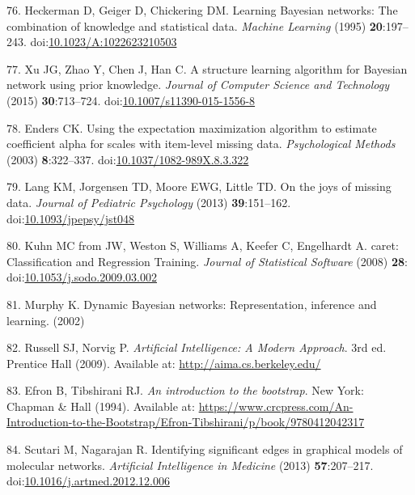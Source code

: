 \documentclass[
  english,
  man]{apa6}
\newenvironment{cslreferences}%
  {}%
  {\par}
\begin{document}
\begin{cslreferences}
\leavevmode\hypertarget{ref-Heckerman1995}{}%
76. Heckerman D, Geiger D, Chickering DM. Learning Bayesian networks: The combination of knowledge and statistical data. \emph{Machine Learning} (1995) \textbf{20}:197--243. doi:\href{https://doi.org/10.1023/A:1022623210503}{10.1023/A:1022623210503}

\leavevmode\hypertarget{ref-Xu2015}{}%
77. Xu JG, Zhao Y, Chen J, Han C. A structure learning algorithm for Bayesian network using prior knowledge. \emph{Journal of Computer Science and Technology} (2015) \textbf{30}:713--724. doi:\href{https://doi.org/10.1007/s11390-015-1556-8}{10.1007/s11390-015-1556-8}

\leavevmode\hypertarget{ref-Enders2003}{}%
78. Enders CK. Using the expectation maximization algorithm to estimate coefficient alpha for scales with item-level missing data. \emph{Psychological Methods} (2003) \textbf{8}:322--337. doi:\href{https://doi.org/10.1037/1082-989X.8.3.322}{10.1037/1082-989X.8.3.322}

\leavevmode\hypertarget{ref-Lang2014}{}%
79. Lang KM, Jorgensen TD, Moore EWG, Little TD. On the joys of missing data. \emph{Journal of Pediatric Psychology} (2013) \textbf{39}:151--162. doi:\href{https://doi.org/10.1093/jpepsy/jst048}{10.1093/jpepsy/jst048}

\leavevmode\hypertarget{ref-Kuhn2008}{}%
80. Kuhn MC from JW, Weston S, Williams A, Keefer C, Engelhardt A. caret: Classification and Regression Training. \emph{Journal of Statistical Software} (2008) \textbf{28}: doi:\href{https://doi.org/10.1053/j.sodo.2009.03.002}{10.1053/j.sodo.2009.03.002}

\leavevmode\hypertarget{ref-Murphy2002}{}%
81. Murphy K. Dynamic Bayesian networks: Representation, inference and learning. (2002)

\leavevmode\hypertarget{ref-Norvig2009}{}%
82. Russell SJ, Norvig P. \emph{Artificial Intelligence: A Modern Approach}. 3rd ed. Prentice Hall (2009). Available at: \url{http://aima.cs.berkeley.edu/}

\leavevmode\hypertarget{ref-Efron1993}{}%
83. Efron B, Tibshirani RJ. \emph{An introduction to the bootstrap}. New York: Chapman \& Hall (1994). Available at: \url{https://www.crcpress.com/An-Introduction-to-the-Bootstrap/Efron-Tibshirani/p/book/9780412042317}

\leavevmode\hypertarget{ref-Scutari2013}{}%
84. Scutari M, Nagarajan R. Identifying significant edges in graphical models of molecular networks. \emph{Artificial Intelligence in Medicine} (2013) \textbf{57}:207--217. doi:\href{https://doi.org/10.1016/j.artmed.2012.12.006}{10.1016/j.artmed.2012.12.006}


\end{cslreferences}
\end{document}
